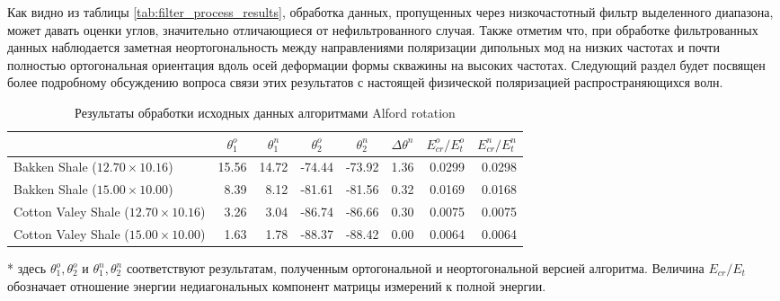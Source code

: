 \documentclass[a4paper,11pt]{article}
\begin{document}
Как видно из таблицы \ref{tab:filter_process_results}, обработка данных, пропущенных через низкочастотный фильтр выделенного диапазона, может давать оценки углов, значительно отличающиеся от нефильтрованного случая. Также отметим что, при обработке фильтрованных данных наблюдается заметная неортогональность между направлениями поляризации дипольных мод на низких частотах и почти полностью ортогональная ориентация вдоль осей деформации формы скважины на высоких частотах. Следующий раздел будет посвящен более подробному обсуждению вопроса связи этих результатов с настоящей физической поляризацией распространяющихся волн.

\begin{table}[h]
\footnotesize
\caption{Результаты обработки исходных данных алгоритмами Alford rotation}
\renewcommand{\arraystretch}{1.5}
\begin{tabularx}{\textwidth}{|X|rr|rr|r|rr|}
\hline	
				&\multicolumn{1}{c}{$\theta_1^o$} & \multicolumn{1}{c|}{$\theta_1^n$} & \multicolumn{1}{c}{$\theta_2^o$} & \multicolumn{1}{c|}{$\theta_2^n$} & \multicolumn{1}{c|}{$\Delta\theta^n$}& \multicolumn{1}{c}{$E_{cr}^o/E_{t}^o$} & \multicolumn{1}{c|}{$E_{cr}^n/E_{t}^n$} \\ \hline
\hline Bakken Shale ($12.70 \times 10.16$) & 15.56 & 14.72 & -74.44 & -73.92  & 1.36  & 0.0299 & 0.0298 \\
\hline Bakken Shale ($15.00 \times 10.00$) & 8.39 & 8.12 & -81.61 & -81.56 & 0.32 & 0.0169 & 0.0168 \\
\hline Cotton Valey Shale ($12.70 \times 10.16$) & 3.26 & 3.04 & -86.74 & -86.66  & 0.30 & 0.0075 & 0.0075 \\ 
\hline Cotton Valey Shale ($15.00 \times 10.00$) & 1.63 & 1.78 & -88.37 & -88.42  & 0.00  & 0.0064 & 0.0064 \\	   
 	   \hline
\end{tabularx} 
\begin{flushleft}
* здесь $\theta_1^o,\theta_2^o$ и $\theta_1^n,\theta_2^n$ соответствуют результатам, полученным ортогональной и неортогональной версией алгоритма. Величина $E_{cr}/E_{t}$ обозначает отношение энергии недиагональных компонент матрицы измерений к полной энергии.
\end{flushleft}
\label{tab:std_process_results}
\renewcommand{\arraystretch}{1.0}
\end{table}
\end{document}

